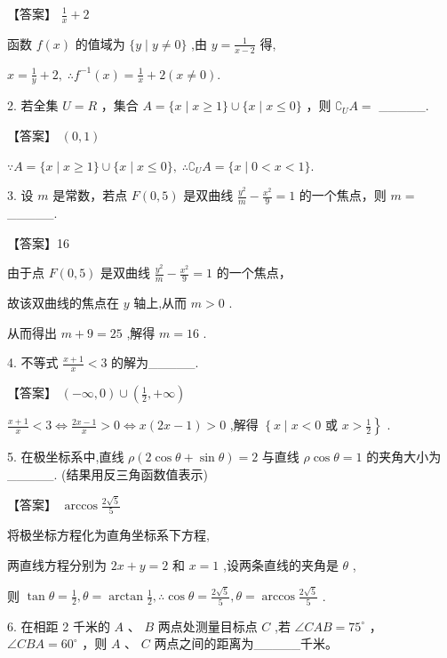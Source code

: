 \documentclass[10pt]{article}
\begin{document}
【答案】 \(\frac{1}{x} + 2\)

函数 \(f\left( x\right)\) 的值域为 \(\{ y \mid  y \neq  0\}\) ,由 \(y = \frac{1}{x - 2}\) 得,

\(x = \frac{1}{y} + 2,\;\therefore {f}^{-1}\left( x\right)  = \frac{1}{x} + 2\left( {x \neq  0}\right) .\)

2. 若全集 \(U = R\) ，集合 \(A = \{ x \mid  x \geq  1\}  \cup  \{ x \mid  x \leq  0\}\) ，则 \({\complement }_{U}A =\) \_\_\_\_\_.

【答案】 \(\left( {0,1}\right)\)

\(\because A = \{ x \mid  x \geq  1\}  \cup  \{ x \mid  x \leq  0\} ,\;\therefore {\complement }_{U}A = \{ x \mid  0 < x < 1\} .\)

3. 设 \(m\) 是常数，若点 \(F\left( {0,5}\right)\) 是双曲线 \(\frac{{y}^{2}}{m} - \frac{{x}^{2}}{9} = 1\) 的一个焦点，则 \(m =\) \_\_\_\_\_.

【答案】16

由于点 \(F\left( {0,5}\right)\) 是双曲线 \(\frac{{y}^{2}}{m} - \frac{{x}^{2}}{9} = 1\) 的一个焦点，

故该双曲线的焦点在 \(y\) 轴上,从而 \(m > 0\) .

从而得出 \(m + 9 = {25}\) ,解得 \(m = {16}\) .

4. 不等式 \(\frac{x + 1}{x} < 3\) 的解为\_\_\_\_\_.

【答案】 \(\left( {-\infty ,0}\right)  \cup  \left( {\frac{1}{2}, + \infty }\right)\)

\(\frac{x + 1}{x} < 3 \Leftrightarrow  \frac{{2x} - 1}{x} > 0 \Leftrightarrow  x\left( {{2x} - 1}\right)  > 0\) ,解得 \(\left\{  {x \mid  x < 0}\right.\) 或 \(\left. {x > \frac{1}{2}}\right\}\) .

5. 在极坐标系中,直线 \(\rho \left( {2\cos \theta  + \sin \theta }\right)  = 2\) 与直线 \(\rho \cos \theta  = 1\) 的夹角大小为\_\_\_\_\_. (结果用反三角函数值表示)

【答案】 \(\arccos \frac{2\sqrt{5}}{5}\)

将极坐标方程化为直角坐标系下方程,

两直线方程分别为 \({2x} + y = 2\) 和 \(x = 1\) ,设两条直线的夹角是 \(\theta\) ,

则 \(\tan \theta  = \frac{1}{2},\theta  = \arctan \frac{1}{2},\therefore \cos \theta  = \frac{2\sqrt{5}}{5},\theta  = \arccos \frac{2\sqrt{5}}{5}\) .

6. 在相距 2 千米的 \(A\) 、 \(B\) 两点处测量目标点 \(C\) ,若 \(\angle {CAB} = {75}^{ \circ  }\) ， \(\angle {CBA} = {60}^{ \circ  }\) ，则 \(A\) 、 \(C\) 两点之间的距离为\_\_\_\_\_千米。
\end{document}
